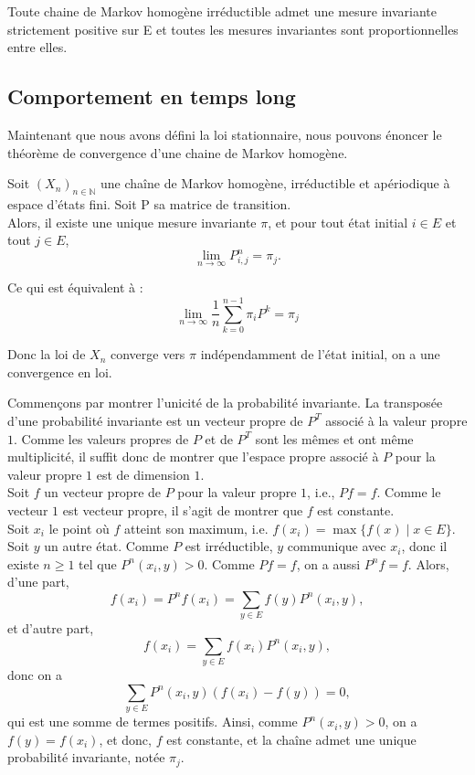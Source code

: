 \documentclass{article}
\begin{document}
\begin{tcolorbox}[colback=white,colframe=blue!80!black,title=Mesures invariantes d'une chaîne de Markov irréductible]
Toute chaine de Markov homogène irréductible admet une mesure invariante strictement positive sur E et toutes les mesures invariantes sont proportionnelles entre elles.
\end{tcolorbox}

\subsection{Comportement en temps long}

Maintenant que nous avons défini la loi stationnaire, nous pouvons énoncer le théorème de convergence d'une chaine de Markov homogène.

\begin{tcolorbox}[colback=white,colframe=red!80!black,title=Théorème de convergence]
Soit $(X_n)_{n \in \mathbb{N}}$ une chaîne de Markov homogène, irréductible et apériodique à espace d'états fini. Soit P sa matrice de transition.\\
Alors, il existe une unique mesure invariante $\pi$, et pour tout état initial $i \in E$ et tout $j \in E$,
\[
\lim_{n \to \infty} P^n_{i,j} = \pi_j.
\]

Ce qui est équivalent à :
\[
\lim_{n \to \infty} \frac{1}{n} \sum_{k=0}^{n-1} \pi_i P^k = \pi_j
\]

Donc la loi de \( X_n \) converge vers $\pi$ indépendamment de l'état initial, on a une convergence en loi.
\end{tcolorbox}

\begin{tcolorbox}[colback=white, colframe=green!80!black, title=Démonstration]
Commençons par montrer l'unicité de la probabilité invariante.
La transposée d'une probabilité invariante est un vecteur propre de $P^T$ associé à la valeur propre $1$.
Comme les valeurs propres de $P$ et de $P^T$ sont les mêmes et ont même multiplicité, il suffit donc de montrer que l'espace propre associé à $P$ pour la valeur propre $1$ est de dimension $1$. \\
Soit $f$ un vecteur propre de $P$ pour la valeur propre $1$, i.e., $Pf = f$. Comme le vecteur $1$ est vecteur propre, il s'agit de montrer que $f$ est constante. \\

Soit $x_i$ le point où $f$ atteint son maximum, i.e. $f(x_i) = \max\{f(x) \mid x \in E\}$. Soit $y$ un autre état. Comme $P$ est irréductible, $y$ communique avec $x_i$, donc il existe $n \geq 1$ tel que $P^n(x_i, y) > 0$. Comme $Pf = f$, on a aussi $P^n f = f$. Alors, d'une part,
\[
f(x_i) = P^n f(x_i) = \sum_{y \in E} f(y) P^n(x_i, y),
\]
et d'autre part,
\[
f(x_i) = \sum_{y \in E} f(x_i) P^n(x_i, y),
\]
donc on a
\[
\sum_{y \in E} P^n(x_i, y) \left(f(x_i) - f(y)\right) = 0,
\]
qui est une somme de termes positifs. Ainsi, comme $P^n(x_i, y) > 0$, on a $f(y) = f(x_i)$, et donc, $f$ est constante, et la chaîne admet une unique probabilité invariante, notée $\pi_j$.
\end{tcolorbox}
\end{document}

